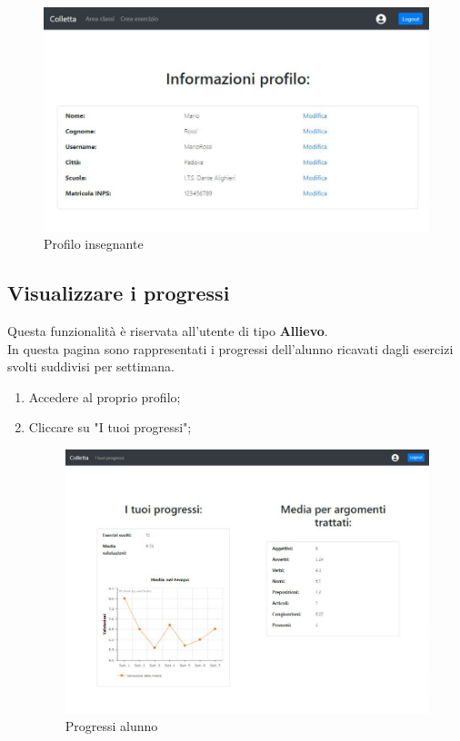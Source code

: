 \documentclass[11pt,a4paper]{article}
\begin{document}
{	\begin{figure}[h]
		\centering
		\includegraphics[scale=0.65]{images/profiloinsegnante.jpg}
		\caption{Profilo insegnante}
	\end{figure}
	
	
	\subsection{Visualizzare i progressi}
	Questa funzionalità è riservata all'utente di tipo \textbf{Allievo}.\\
	In questa pagina sono rappresentati i progressi dell'alunno ricavati dagli esercizi svolti suddivisi per settimana.
	
	\begin{enumerate}
		\item Accedere al proprio profilo;
		\item Cliccare su "I tuoi progressi";
		
		\begin{figure}[h]
		\centering
		\includegraphics[scale=0.65]{images/progressi.jpg}
		\caption{Progressi alunno}
	\end{figure}
	

\end{enumerate}}
\end{document}
